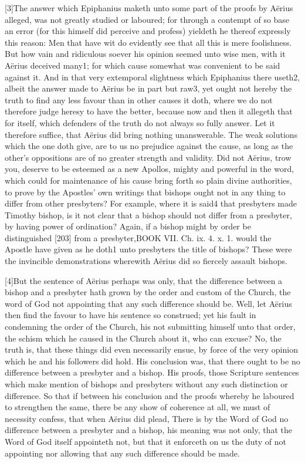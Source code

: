 [3]The answer which Epiphanius maketh unto some part of the proofs by Aërius alleged, was not greatly studied or laboured; for through a contempt of so base an error (for this himself did perceive and profess) yieldeth he thereof expressly this reason: Men that have wit do evidently see that all this is mere foolishness. But how vain and ridiculous soever his opinion seemed unto wise men, with it Aërius deceived many1; for which cause somewhat was convenient to be said against it. And in that very extemporal slightness which Epiphanius there useth2, albeit the answer made to Aërius be in part but raw3, yet ought not hereby the truth to find any less favour than in other causes it doth, where we do not therefore judge heresy to have the better, because now and then it allegeth that for itself, which defenders of the truth do not always so fully answer. Let it therefore suffice, that Aërius did bring nothing unanswerable. The weak solutions which the one doth give, are to us no prejudice against the cause, as long as the other’s oppositions are of no greater strength and validity. Did not Aërius, trow you, deserve to be esteemed as a new Apollos, mighty and powerful in the word, which could for maintenance of his cause bring forth so plain divine authorities, to prove by the Apostles’ own writings that bishops ought not in any thing to differ from other presbyters? For example, where it is said4 that presbyters made Timothy bishop, is it not clear that a bishop should not differ from a presbyter, by having power of ordination? Again, if a bishop might by order be distinguished [203] from a presbyter,BOOK VII. Ch. ix. 4. x. 1. would the Apostle have given as he doth1 unto presbyters the title of bishops? These were the invincible demonstrations wherewith Aërius did so fiercely assault bishops.

[4]But the sentence of Aërius perhaps was only, that the difference between a bishop and a presbyter hath grown by the order and custom of the Church, the word of God not appointing that any such difference should be. Well, let Aërius then find the favour to have his sentence so construed; yet his fault in condemning the order of the Church, his not submitting himself unto that order, the schism which he caused in the Church about it, who can excuse? No, the truth is, that these things did even necessarily ensue, by force of the very opinion which he and his followers did hold. His conclusion was, that there ought to be no difference between a presbyter and a bishop. His proofs, those Scripture sentences which make mention of bishops and presbyters without any such distinction or difference. So that if between his conclusion and the proofs whereby he laboured to strengthen the same, there be any show of coherence at all, we must of necessity confess, that when Aërius did plead, There is by the Word of God no difference between a presbyter and a bishop, his meaning was not only, that the Word of God itself appointeth not, but that it enforceth on us the duty of not appointing nor allowing that any such difference should be made.

